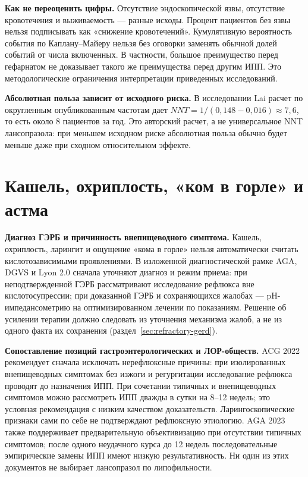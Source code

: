 \documentclass[11pt,a4paper,notitlepage]{report}
\newcommand{\src}[1]{\unskip\space\cite{#1}}
\begin{document}
\textbf{Как не переоценить цифры.} Отсутствие эндоскопической язвы, отсутствие кровотечения и выживаемость --- разные исходы. Процент пациентов без язвы нельзя подписывать как «снижение кровотечений». Кумулятивную вероятность события по Каплану--Майеру нельзя без оговорки заменять обычной долей событий от числа включенных. В частности, большое преимущество перед гефарнатом не доказывает такого же преимущества перед другим ИПП. Это методологические ограничения интерпретации приведенных исследований.\src{aspirin15,nsaid15,misotrial}

\textbf{Абсолютная польза зависит от исходного риска.} В исследовании Lai расчет по округленным опубликованным частотам дает $NNT=1/(0{,}148-0{,}016)\approx 7{,}6$, то есть около 8 пациентов за год. Это авторский расчет, а не универсальное NNT лансопразола: при меньшем исходном риске абсолютная польза обычно будет меньше даже при сходном относительном эффекте.\src{aspirintrial}

\section{Кашель, охриплость, «ком в горле» и астма}
\label{sec:extraesophageal}
\textbf{Диагноз ГЭРБ и причинность внепищеводного симптома.} Кашель, охриплость, ларингит и ощущение «кома в горле» нельзя автоматически считать кислотозависимыми проявлениями. В изложенной диагностической рамке AGA, DGVS и Lyon 2.0 сначала уточняют диагноз и режим приема: при неподтвержденной ГЭРБ рассматривают исследование рефлюкса вне кислотосупрессии; при доказанной ГЭРБ и сохраняющихся жалобах --- pH-импедансометрию на оптимизированном лечении по показаниям. Решение об усилении терапии должно следовать из уточнения механизма жалоб, а не из одного факта их сохранения (раздел~\ref{sec:refractory-gerd}).\src{agagerd,dgvs,lyon}

\textbf{Сопоставление позиций гастроэнтерологических и ЛОР-обществ.} ACG 2022 рекомендует сначала исключать нерефлюксные причины: при изолированных внепищеводных симптомах без изжоги и регургитации исследование рефлюкса проводят до назначения ИПП. При сочетании типичных и внепищеводных симптомов можно рассмотреть ИПП дважды в сутки на 8--12 недель; это условная рекомендация с низким качеством доказательств. Ларингоскопические признаки сами по себе не подтверждают рефлюксную этиологию. AGA 2023 также поддерживает предварительную объективизацию при отсутствии типичных симптомов; после одного неудачного курса до 12 недель последовательные эмпирические замены ИПП имеют низкую результативность. Ни один из этих документов не выбирает лансопразол по липофильности.\src{acggerd,agaextra2023}
\end{document}
